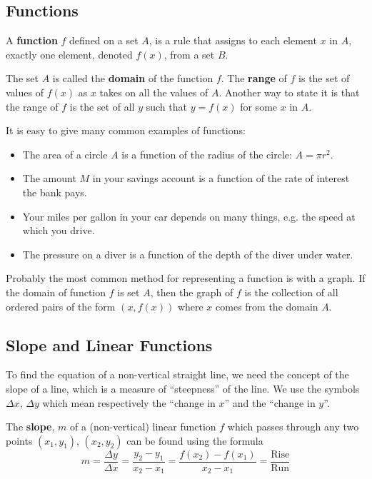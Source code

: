 \subsection*{Functions}
\begin{definition}
    A {\bf function} $f$ defined on a set $A$, is a rule that assigns to each element $x$ in $A$,
exactly one element, denoted $f(x)$, from a set $B$. 

\noindent The set $A$ is called the {\bf domain} of the function $f$. The {\bf range} of $f$ is the set
of values of $f(x)$
as $x$ takes on all the values of $A$.  Another way to state it is that the range of $f$ is the
set of all $y$ such that $y=f(x)$ for some $x$ in $A$.
\end{definition}

It is easy to give many common examples of functions:
\begin{itemize}
    \item The area of a circle $A$ is a function of the radius of the circle:  $A= \pi r^2$.
    \item The amount $M$ in your savings account is a function of the rate of interest the
        bank pays.
    \item Your miles per gallon in your car depends on many things, e.g. the speed at
        which you drive.  
    \item The pressure on a diver is a function of the depth of the diver under water.
\end{itemize}

Probably the most common method for representing a function is with a graph.  If the
domain of function $f$ is set $A$, then the graph of $f$ is the collection of all ordered
pairs of the form $(x,f(x))$ where $x$ comes from the domain $A$.





\subsection*{Slope and Linear Functions}
To find the equation of a non-vertical straight line, we need the concept of the slope of
a line, which is a measure of ``steepness'' of the line.  We use the symbols $\Delta x$,
$\Delta y$ which
mean respectively the ``change in $x$'' and the ``change in $y$''.  
\begin{definition}
    The {\bf slope}, $m$ of a (non-vertical) linear function $f$ which passes through any
    two points $(x_1,y_1)$, $(x_2,y_2)$ can be found using the formula
    \[ m = \frac{\Delta y}{\Delta x} = \frac{y_2 - y_1}{x_2 - x_1} =
    \frac{f(x_2)-f(x_1)}{x_2-x_1} = \frac{\text{Rise}}{\text{Run}} \]
\end{definition}

